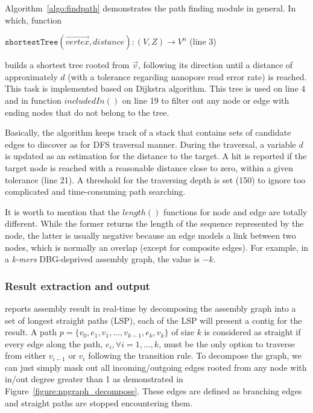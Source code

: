 Algorithm~\ref{algo:findpath} demonstrates the path finding module in general.
In which, function 

$\mathtt{shortestTree}(\overrightarrow{vertex},distance) : (V,Z) \rightarrow V^n$ (line 3)

builds a shortest tree rooted from $\overrightarrow{v}$, following its direction until a distance of approximately $d$ (with a tolerance regarding nanopore read error rate) is reached. This task is implemented based on Dijkstra algorithm.
This tree is used on line 4 and in function $includedIn()$ on line 19 to filter out any node or edge with ending nodes that do not belong to the tree.

Basically, the algorithm keeps track of a stack that contains sets of candidate edges to discover as for DFS traversal manner. During the traversal, a variable $d$ is updated as an estimation for the distance to the target. A hit is reported if the target node is reached with a reasonable distance \IE{} close to zero, within a given tolerance (line 21). 
A threshold for the traversing depth is set (150) to ignore too complicated and time-consuming path searching.

It is worth to mention that the $length()$ functions for node and edge are totally different. While the former returns the length of the sequence represented by the node, the latter is usually negative because an edge models a link between two nodes, which is normally an overlap (except for composite edges). For example, in a \emph{k-mers} DBG-deprived assembly graph, the value is $-k$. 
\subsubsection{Result extraction and output}
\npgraph{} reports assembly result in real-time by decomposing the assembly graph into a set of longest straight paths (LSP), each of the LSP will present a contig for the result.
A path $p=\{v_0,e_1,v_1,\ldots,v_{k-1},e_k,v_k\}$ of size $k$ is considered as straight if every edge along the path, $e_i, \forall i=1,\ldots,k$, must be the only option to traverse from either $v_{i-1}$ or $v_i$ following the transition rule.
To decompose the graph, we can just simply mask out all incoming/outgoing edges rooted from any node with in/out degree greater than 1 as demonstrated in Figure~\ref{figure:npgraph_decompose}. These edges are defined as branching edges and straight paths are stopped encountering them.

